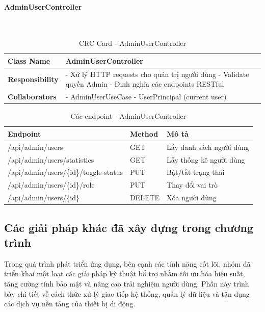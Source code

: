 \paragraph{AdminUserController} ~\\

\begin{table}[H]
\small
\renewcommand{\arraystretch}{1.3}
\begin{tabularx}{\textwidth}{|>{\raggedright\arraybackslash}p{3.5cm}|X|}
\hline
\rowcolor{gray!20}
\textbf{Class Name} & AdminUserController \\
\hline
\textbf{Responsibility} & - Xử lý HTTP requests cho quản trị người dùng \newline - Validate quyền Admin \newline - Định nghĩa các endpoints RESTful \\
\hline
\textbf{Collaborators} & - AdminUserUseCase \newline - UserPrincipal (current user) \\
\hline
\end{tabularx}
\caption{CRC Card - AdminUserController}
\end{table}

\begin{table}[H]
\small
\renewcommand{\arraystretch}{1.3}
\begin{tabularx}{\textwidth}{|>{\raggedright\arraybackslash}p{5cm}|>{\raggedright\arraybackslash}p{2cm}|X|}
\hline
\rowcolor{gray!20}
\textbf{Endpoint} & \textbf{Method} & \textbf{Mô tả} \\
\hline
/api/admin/users & GET & Lấy danh sách người dùng \\
\hline
/api/admin/users/statistics & GET & Lấy thống kê người dùng \\
\hline
/api/admin/users/\{id\}/toggle-status & PUT & Bật/tắt trạng thái \\
\hline
/api/admin/users/\{id\}/role & PUT & Thay đổi vai trò \\
\hline
/api/admin/users/\{id\} & DELETE & Xóa người dùng \\
\hline
\end{tabularx}
\caption{Các endpoint - AdminUserController}
\end{table}

\subsection{Các giải pháp khác đã xây dựng trong chương trình}
Trong quá trình phát triển ứng dụng, bên cạnh các tính năng cốt lõi, nhóm đã triển khai một loạt các giải pháp kỹ thuật bổ trợ nhằm tối ưu hóa hiệu suất, tăng cường tính bảo mật và nâng cao trải nghiệm người dùng. Phần này trình bày chi tiết về cách thức xử lý giao tiếp hệ thống, quản lý dữ liệu và tận dụng các dịch vụ nền tảng của thiết bị di động.

